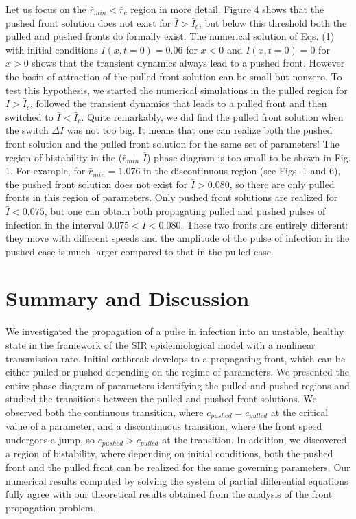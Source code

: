 \documentclass[pre,aps,twocolumn,showpacs]{revtex4}
\begin{document}
Let us focus on the $\bar{r}_{min}<\bar{r}_{c}$ region in more detail. Figure 4 shows that the pushed front solution does not exist for $\bar{I}>\bar{I}_c$, but below this threshold both the pulled and pushed fronts do formally exist. The numerical solution of Eqs. (1) with initial conditions $I(x,t=0) = 0.06$ for $x<0$ and $I(x,t=0) = 0$ for $x>0$ shows that the transient dynamics always lead to a pushed front. However the basin of attraction of the pulled front solution can be small but nonzero. To test this hypothesis, we started the numerical simulations in the pulled region for $I>\bar{I}_c$, followed the transient dynamics that leads to a pulled front and then switched to $\bar{I}<\bar{I}_c$. Quite remarkably, we did find the pulled front solution when the switch $\Delta\bar{I}$ was not too big. It means that one can realize both the pushed front solution and the pulled front solution for the same set of parameters! The region of bistability in the ($\bar{r}_{min}$ $\bar{I}$) phase diagram is too small to be shown in Fig. 1. For example, for $\bar{r}_{min}=1.076$ in the discontinuous region (see Figs. 1 and 6), the pushed front solution does not exist for $\bar{I}>0.080$, so there are only pulled fronts in this region of parameters. Only pushed front solutions are realized for $\bar{I}<0.075$, but one can obtain both propagating pulled and pushed pulses of infection in the interval $0.075<\bar{I}<0.080$. These two fronts are entirely different: they move with different speeds and the amplitude of the pulse of infection in the pushed case is much larger compared to that in the pulled case.

\section{Summary and Discussion}

We investigated the propagation of a pulse in infection into an unstable, healthy state in the framework of the SIR epidemiological model with a nonlinear transmission rate. Initial outbreak develops to a propagating front, which can be either pulled or pushed depending on the regime of parameters. We presented the entire phase diagram of parameters identifying the pulled and pushed regions and studied the transitions between the pulled and pushed front solutions. We observed both the continuous transition, where $c_{pushed} = c_{pulled}$ at the critical value of a parameter, and a discontinuous transition, where the front speed undergoes a jump, so $c_{pushed} > c_{pulled}$ at the transition. In addition, we discovered a region of bistability, where depending on initial conditions, both the pushed front and the pulled front can be realized for the same governing parameters. Our numerical results computed by solving the system of partial differential equations fully agree with our theoretical results obtained from the analysis of the front propagation problem.
\end{document}
